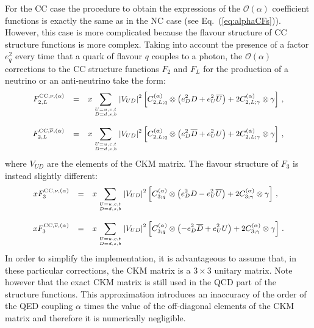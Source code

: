 For the CC case the procedure to obtain the expressions of the
$\mathcal{O}(\alpha)$ coefficient functions is exactly the same as in
the NC case (see Eq.~(\ref{eq:alphaCFs})). However, this case is more
complicated because the flavour structure of CC structure functions is
more complex. Taking into account the presence of a factor $e_q^2$
every time that a quark of flavour $q$ couples to a photon, the
$\mathcal{O}(\alpha)$ corrections to the CC structure functions $F_2$
and $F_L$ for the production of a neutrino or an anti-neutrino take
the form:
\begin{equation}\label{compactNu}
\small
\begin{array}{rcl}
F_{2,L}^{{\rm CC},\nu,(\alpha)} &=& \displaystyle
                              x\sum_{U=u,c,t \atop D=d,s,b}|V_{UD}|^2\left[C_{2,L;q}^{(\alpha)}\otimes\left(e_D^2D +e_U^2\overline{U}\right) +2 C_{2,L;\gamma}^{(\alpha)}\otimes\gamma\right]\,,\\
\\
F_{2,L}^{{\rm CC},\overline{\nu},(\alpha)} &=& \displaystyle
x\sum_{U=u,c,t \atop D=d,s,b}|V_{UD}|^2\left[C_{2,L;q}^{(\alpha)}\otimes\left(e_D^2\overline{D}
    +e_U^2U\right) +2 C_{2,L;\gamma}^{(\alpha)}\otimes\gamma\right]\,,
\end{array}
\end{equation}
where $V_{UD}$ are the elements of the CKM matrix. The flavour
structure of $F_3$ is instead slightly different:
\begin{equation}\label{compactNuF3}
\small
\begin{array}{rcl}
xF_3^{{\rm CC},\nu,(\alpha)} &=& \displaystyle
                              x\sum_{U=u,c,t \atop D=d,s,b}|V_{UD}|^2\left[C_{3;q}^{(\alpha)}\otimes\left(e_D^2D -e_U^2\overline{U}\right) +2 C_{3;\gamma}^{(\alpha)}\otimes\gamma\right]\,,\\
\\
xF_3^{{\rm CC},\overline{\nu},(\alpha)} &=& \displaystyle
x\sum_{U=u,c,t \atop D=d,s,b}|V_{UD}|^2\left[C_{3;q}^{(\alpha)}\otimes\left(-e_D^2\overline{D}
    +e_U^2U\right) +2 C_{3;\gamma}^{(\alpha)}\otimes\gamma\right]\,.
\end{array}
\end{equation}
In order to simplify the implementation, it is advantageous to assume
that, in these particular corrections, the CKM matrix is a
$3 \times 3$ unitary matrix. Note however that the exact CKM matrix is
still used in the QCD part of the structure functions. This
approximation introduces an inaccuracy of the order of the QED
coupling $\alpha$ times the value of the off-diagonal elements of the
CKM matrix and therefore it is numerically negligible.

